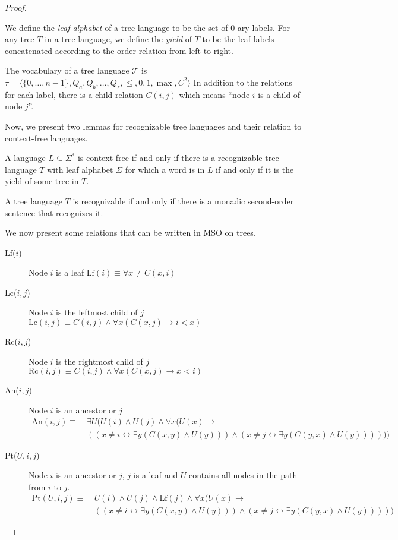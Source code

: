 \begin{proof}
\begin{define}
        We define the \emph{leaf alphabet} of a tree language to be the set of $0$-ary labels.
        For any tree $T$ in a tree language, we define the \emph{yield} of $T$ to be the leaf labels concatenated according to the order relation from left to right.

        The vocabulary of a tree language $\mathcal{T}$ is $\tau = \langle \{0, \dots, n - 1\}, Q_a, Q_b, \dots, Q_z, \leq , 0, 1, \max , C^2 \rangle$
        In addition to the relations for each label, there is a child relation $C(i, j)$ which means ``node $i$ is a child of node $j$''.
    \end{define}

    Now, we present two lemmas for recognizable tree languages and their relation to context-free languages.
    \begin{lemma}
        A language $L \subseteq \Sigma^{*}$ is context free if and only if there is a recognizable tree language $T$ with leaf alphabet $\Sigma$ for which a word is in $L$ if and only if it is the yield of some tree in $T$.
    \end{lemma}

    \begin{lemma}
        A tree language $T$ is recognizable if and only if there is a monadic second-order sentence that recognizes it.
    \end{lemma}

    We now present some relations that can be written in MSO on trees.
    \begin{description}
        \item[Lf($i$)] Node $i$ is a leaf $\text{Lf}(i) \equiv \forall x \neq C(x, i)$
        \item[Lc($i, j$)] Node $i$ is the leftmost child of $j$ $\text{Lc}(i, j) \equiv C(i, j) \land \forall x (C(x, j) \to i < x)$
        \item[Rc($i, j$)] Node $i$ is the rightmost child of $j$ $\text{Rc}(i, j) \equiv C(i, j) \land \forall x (C(x, j) \to x < i)$
        \item[An($i, j$)] Node $i$ is an ancestor or $j$
        \begin{align*}
            \text{An}(i, j) \equiv~&\exists U (U(i) \land U(j) \land \forall x (U(x) \to \\
            &((x \neq i \leftrightarrow \exists y (C(x, y) \land U(y))) \land (x \neq j \leftrightarrow \exists y (C(y, x) \land U(y))))))
        \end{align*}
        \item[Pt($U, i, j$)] Node $i$ is an ancestor or $j$, $j$ is a leaf and $U$ contains all nodes in the path from $i$ to $j$.
        \begin{align*}
            \text{Pt}(U, i, j) \equiv~&U(i) \land U(j) \land \text{Lf}(j) \land \forall x (U(x) \to \\
            &((x \neq i \leftrightarrow \exists y (C(x, y) \land U(y))) \land (x \neq j \leftrightarrow \exists y (C(y, x) \land U(y)))))
        \end{align*}
    \end{description}


\end{proof}
